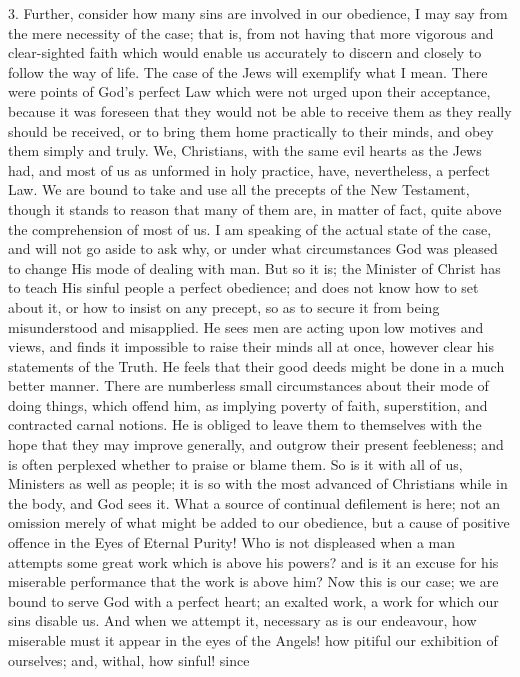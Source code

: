 3. Further, consider how many sins are involved in our
obedience, I may say from the mere necessity of the case;
that is, from not having that more vigorous and
clear-sighted faith which would enable us accurately to
discern and closely to follow the way of life. The case
of the Jews will exemplify what I mean. There were points
of God's perfect Law which were not urged upon their
acceptance, because it was foreseen that they would not
be able to receive them as they really should be
received, or to bring them home practically to their
minds, and obey them simply and truly. We, Christians,
with the same evil hearts as the Jews had, and most of us
as unformed in holy practice, have, nevertheless, a
perfect Law. We are bound to take and use all the
precepts of the New Testament, though it stands to reason
that many of them are, in matter of fact, quite above the
comprehension of most of us. I am speaking of the actual
state of the case, and will not go aside to ask why, or
under what circumstances God was pleased to change His
mode of dealing with man. But so it is; the Minister of
Christ has to teach His sinful people a perfect
obedience; and does not know how to set about it, or how
to insist on any precept, so as to secure it from being
misunderstood and misapplied. He sees men are acting upon
low motives and views, and finds it impossible to raise
their minds all at once, however clear his statements of
the Truth. He feels that their good deeds might be done
in a much better manner. There are numberless small
circumstances about their mode of doing things, which
offend him, as implying poverty of faith, superstition,
and contracted carnal notions. He is obliged to leave
them to themselves with the hope that they may improve
generally, and outgrow their present feebleness; and is
often perplexed whether to praise or blame them. So is it
with all of us, Ministers as well as people; it is so
with the most advanced of Christians while in the body,
and God sees it. What a source of continual defilement is
here; not an omission merely of what might be added to
our obedience, but a cause of positive offence in the
Eyes of Eternal Purity! Who is not displeased when a man
attempts some great work which is above his powers? and
is it an excuse for his miserable performance that the
work is above him? Now this is our case; we are bound to
serve God with a perfect heart; an exalted work, a work
for which our sins disable us. And when we attempt it,
necessary as is our endeavour, how miserable must it
appear in the eyes of the Angels! how pitiful our
exhibition of ourselves; and, withal, how sinful! since
